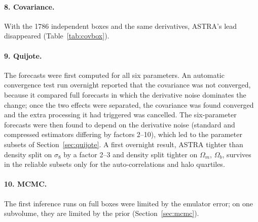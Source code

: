 \paragraph{8. Covariance.} With the 1786 independent boxes and the same derivatives, ASTRA's lead disappeared (Table~\ref{tab:covbox}).

\paragraph{9. Quijote.} The forecasts were first computed for all six parameters. An automatic convergence test run overnight reported that the covariance was not converged, because it compared full forecasts in which the derivative noise dominates the change; once the two effects were separated, the covariance was found converged and the extra processing it had triggered was cancelled. The six-parameter forecasts were then found to depend on the derivative noise (standard and compressed estimators differing by factors 2--10), which led to the parameter subsets of Section~\ref{sec:quijote}. A first overnight result, ASTRA tighter than density split on $\sigma_8$ by a factor 2--3 and density split tighter on $\Omega_m$, $\Omega_b$, survives in the reliable subsets only for the auto-correlations and halo quartiles.

\paragraph{10. MCMC.} The first inference runs on full boxes were limited by the emulator error; on one subvolume, they are limited by the prior (Section~\ref{sec:mcmc}).
